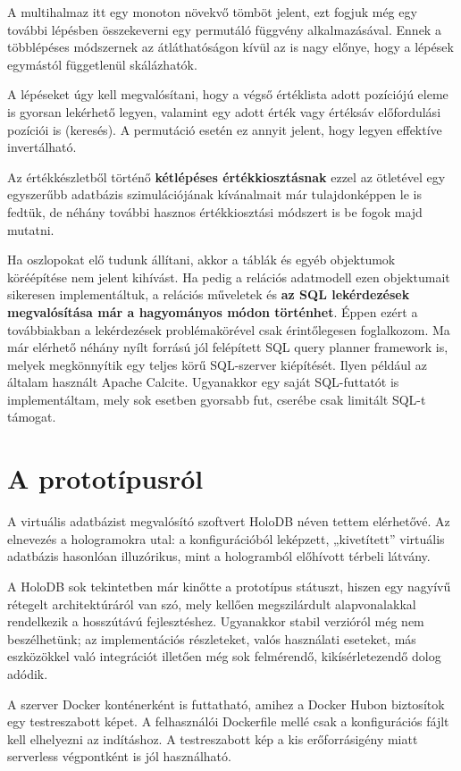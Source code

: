 \documentclass[
    parspace,
    noindent,
    nohyp,
]{elteiktdk}[2023/04/10]
\begin{document}
A multihalmaz itt egy monoton növekvő tömböt jelent,
ezt fogjuk még egy további lépésben összekeverni egy permutáló függvény alkalmazásával.
Ennek a többlépéses módszernek az átláthatóságon kívül az is nagy előnye,
hogy a lépések egymástól függetlenül skálázhatók.

A lépéseket úgy kell megvalósítani, hogy a végső értéklista adott pozíciójú eleme is gyorsan lekérhető legyen,
valamint egy adott érték vagy értéksáv előfordulási pozíciói is
(keresés).
A permutáció esetén ez annyit jelent, hogy legyen effektíve invertálható.

Az értékkészletből történő \textbf{kétlépéses értékkiosztásnak} ezzel az ötletével
egy egyszerűbb adatbázis szimulációjának kívánalmait már tulajdonképpen le is fedtük,
de néhány további hasznos értékkiosztási módszert is be fogok majd mutatni.

Ha oszlopokat elő tudunk állítani,
akkor a táblák és egyéb objektumok köréépítése nem jelent kihívást.
Ha pedig a relációs adatmodell ezen objektumait sikeresen implementáltuk,
a relációs műveletek és \textbf{az SQL lekérdezések megvalósítása már a hagyományos módon történhet}.
Éppen ezért a továbbiakban a lekérdezések problémakörével csak érintőlegesen foglalkozom.
Ma már elérhető néhány nyílt forrású jól felépített SQL query planner framework is,
melyek megkönnyítik egy teljes körű SQL-szerver kiépítését.
Ilyen például az általam használt Apache Calcite.
Ugyanakkor egy saját SQL-futtatót is implementáltam, mely sok esetben gyorsabb fut,
cserébe csak limitált SQL-t támogat.


\section{A prototípusról}

A virtuális adatbázist megvalósító szoftvert HoloDB néven tettem elérhetővé.
Az elnevezés a hologramokra utal:
a konfigurációból leképzett, „kivetített” virtuális adatbázis hasonlóan illuzórikus,
mint a hologramból előhívott térbeli látvány.

A HoloDB sok tekintetben már kinőtte a prototípus státuszt,
hiszen egy nagyívű rétegelt architektúráról van szó,
mely kellően megszilárdult alapvonalakkal rendelkezik a hosszútávú fejlesztéshez.
Ugyanakkor stabil verzióról még nem beszélhetünk;
az implementációs részleteket, valós használati eseteket,
más eszközökkel való integrációt illetően még sok felmérendő, kikísérletezendő dolog adódik.

A szerver Docker konténerként is futtatható, amihez a Docker Hubon biztosítok egy testreszabott képet.
A felhasználói Dockerfile mellé csak a konfigurációs fájlt kell elhelyezni az indításhoz.
A testreszabott kép a kis erőforrásigény miatt serverless végpontként is jól használható.
\end{document}
